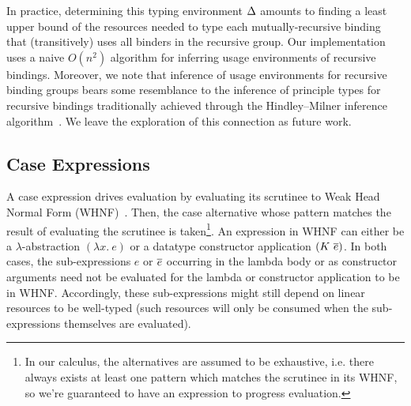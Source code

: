 \documentclass[acmsmall,review,anonymous,screen]{acmart}
\begin{document}
In practice, determining this typing environment $\Delta$ amounts to finding a
least upper bound of the resources needed to type each mutually-recursive
binding that (transitively) uses all binders in the recursive group.
%
Our implementation uses a naive $O(n^2)$ algorithm for inferring usage
environments of recursive bindings.
%
%
Moreover, we note that inference of usage environments for recursive binding
groups bears some resemblance to the inference of principle types for recursive
bindings traditionally achieved through the Hindley–Milner inference
algorithm~\cite{DBLP:conf/popl/DamasM82}. %
We leave the exploration of this connection
as future work.


\subsection{Case Expressions\label{sec:lc-case-exps}}

%
%
%
A case expression drives evaluation by evaluating its scrutinee to Weak Head
Normal Form (WHNF)~\cite{10.5555/1096899}. Then, the case
alternative whose pattern matches the result of evaluating the
scrutinee is taken\footnote{In our calculus, the alternatives are assumed to be
  exhaustive, i.e. there always exists at least one pattern which
  matches the scrutinee in its WHNF, so we're guaranteed to have an
  expression to progress evaluation.}.
An expression in WHNF can either be %
a $\lambda$-abstraction $(\lambda x.~e)$ 
or a datatype constructor application $(K~\overline{e})$.
In both cases, the sub-expressions $e$ or $\overline{e}$ occurring in the lambda body
or as constructor arguments need not be evaluated for the lambda or constructor
application to be in WHNF. %
%
Accordingly, these sub-expressions might still depend on linear resources to be
well-typed (such resources will only be consumed when the sub-expressions themselves are evaluated).
\end{document}
